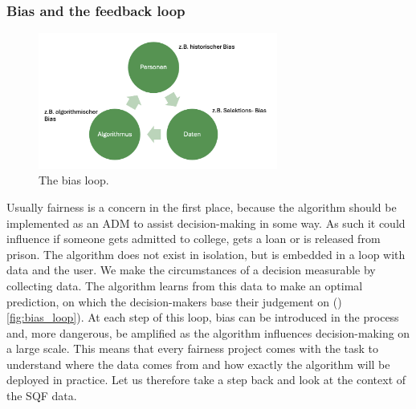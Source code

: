 \subsubsection*{Bias and the feedback loop}
\begin{figure}
    \centering
    \includegraphics[width=0.7\textwidth]{../figures/bias_loop.png}
    \caption{The bias loop.}
    \label{fig:bias_loop}
\end{figure}

Usually fairness is a concern in the first place, because the algorithm should be implemented as an ADM to assist decision-making in some way. As such it could influence if someone gets admitted to college, gets a loan or is released from prison. The algorithm does not exist in isolation, but is embedded in a loop with data and the user.
We make the circumstances of a decision measurable by collecting data. The algorithm learns from this data to make an optimal prediction, on which the decision-makers base their judgement on ()\autoref{fig:bias_loop}). At each step of this loop, bias can be introduced in the process and, more dangerous, be amplified as the algorithm influences decision-making on a large scale.
This means that every fairness project comes with the task to understand where the data comes from and how exactly the algorithm will be deployed in practice. Let us therefore take a step back and look at the context of the SQF data.







